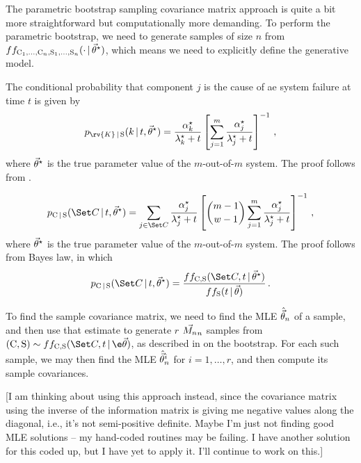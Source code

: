\documentclass[../main.tex]{subfiles}
\begin{document}
The parametric bootstrap sampling covariance matrix approach is quite a bit more straightforward but computationally more demanding. To perform the parametric bootstrap, we need to generate samples of size $n$ from $f{f_{\mathrm{C}_1, \ldots, \mathrm{C}_n, \mathrm{S}_1, \ldots, \mathrm{S}_n}}(\cdot {\,|\,} {\vec\theta}^{\star})$, which means we need to explicitly define the generative model.

The conditional probability that component $j$ is the cause of ae system failure at time $t$ is given by
\begin{equation}
\label{eq:pareto_cond_prob}
    \pmf_{\rv{K} \given \sv}(k \given t, \tparam{\vec\theta}) =
    \frac{ \tparam{\alpha}_k }{ \tparam{\lambda}_k + t }
    \left [
        \sum_{j=1}^{m} \frac{ \tparam{\alpha}_j }{ \tparam{\lambda}_j + t }
    \right ]^{-1}
    \,,
\end{equation}
where ${\vec\theta}^{\star}$ is the true parameter value of the $m$-out-of-$m$ system. The proof follows from .

\begin{equation}
\label{eq:pareto_cond_cand_prob}
    \pmf_{\rvcand \given \sv}(\cand \given t, \tparam{\vec\theta}) =
    \sum_{j \in \cand} \frac{ \tparam{\alpha}_j }{ \tparam{\lambda}_j + t }
    \left [
        {{m-1} \choose {w-1}}
        \sum_{j=1}^{m} \frac{ \tparam{\alpha}_j }{ \tparam{\lambda}_j + t }
    \right ]^{-1}
    \,,
\end{equation}
where ${\vec\theta}^{\star}$ is the true parameter value of the $m$-out-of-$m$ system.
The proof follows from Bayes law, in which
\begin{equation}
    \pmf_{\rvcand \given \sv}(\cand \given t, \tparam{\vec\theta}) =
    \frac{\pdf{f_{\rvcand, \sv}}(\cand, t \given \tparam{\vec\theta})}
    { \pdf{f_{\sv}}(t \given \vec\theta)}\,.
\end{equation}

To find the sample covariance matrix, we need to find the MLE $\hat{\vec\theta}_n$ of a sample, and then use that estimate to generate $r$ $\vec{M_n}_n$ samples from $(\rvcand, \sv) \sim \pdf{f_{\rvcand, \sv}}(\cand, t \given \e\vec\theta)$, as described in  on the bootstrap. For each such sample, we may then find the MLE $\hat{\vec\theta}_n^{i}$ for $i=1,\ldots,r$, and then compute its sample covariances.

[I am thinking about using this approach instead, since the covariance matrix using the inverse of the information matrix is giving me negative values along the diagonal, i.e., it's not semi-positive definite. Maybe I'm just not finding good MLE solutions -- my hand-coded routines may be failing. I have another solution for this coded up, but I have yet to apply it. I'll continue to work on this.]
\end{document}
